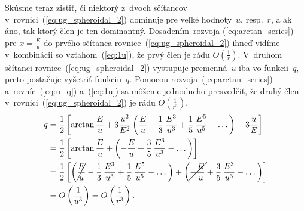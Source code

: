 \documentclass[a4paper, 12pt]{book}
\begin{document}
Skúsme teraz zistiť, či niektorý z~dvoch sčítancov 
v~rovnici~(\ref{eq:ug_spheroidal_2}) dominuje pre veľké hodnoty~$u$, resp.~$r$,  
a ak áno, tak ktorý člen je ten dominantný.  Dosadením~rozvoja 
(\ref{eq:arctan_series}) pre $x = \frac{E}{u}$ do prvého sčítanca 
rovnice~(\ref{eq:ug_spheroidal_2}) ihneď vidíme v~kombinácii so 
vzťahom~(\ref{eq:1u}), že prvý člen je rádu $O\left( \frac{1}{r} \right)$.  
V~druhom sčítanci rovnice~(\ref{eq:ug_spheroidal_2}) vystupuje premenná~$u$ iba 
vo funkcii~$q$, preto postačuje vyšetriť funkciu~$q$.  Pomocou 
rozvoja~(\ref{eq:arctan_series}) a~rovníc~(\ref{eq:u_q}) a~(\ref{eq:1u}) sa 
môžeme jednoducho presvedčiť, že druhý člen 
v~rovnici~(\ref{eq:ug_spheroidal_2}) je rádu $O\left( \frac{1}{r^3} \right)$,
%
\begin{equation}
\begin{split}
q &= \frac{1}{2} \left[ \arctan\frac{E}{u} + 3\frac{u^2}{E^2} \left( 
\frac{E}{u} - \frac{1}{3} \, \frac{E^3}{u^3} + \frac{1}{5} \, \frac{E^5}{u^5} 
- \dots
\right) - 3\frac{u}{E} \right]\\
%
&= \frac{1}{2} \left[ \arctan\frac{E}{u} + \left( - \frac{E}{u} + \frac{3}{5} 
\, \frac{E^3}{u^3} - \dots \right) \right]\\
%
&= \frac{1}{2} \left[ \left(\cancel{\frac{E}{u}} - \frac{1}{3} \, 
\frac{E^3}{u^3} + \frac{1}{5} \, \frac{E^5}{u^5} - \dots \right) + \left( 
\cancel{- \frac{E}{u}} + \frac{3}{5} \, \frac{E^3}{u^3} - \dots \right) 
\right]\\
%
&=O\left( \frac{1}{u^3} \right) = O\left( \frac{1}{r^3} \right){.}
\end{split}
\end{equation}
\end{document}
